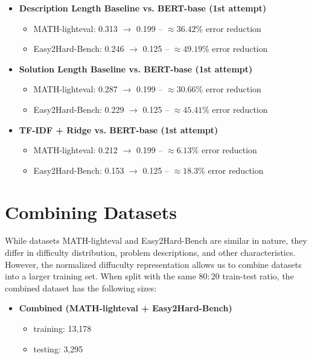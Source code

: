 \documentclass[runningheads]{llncs}
\begin{document}
\begin{itemize}
    \item \textbf{Description Length Baseline vs. BERT-base (1st attempt)}
    \begin{itemize}
        \item MATH-lighteval: 0.313 $\to$ 0.199 -- $\approx 36.42\%$ error reduction
        \item Easy2Hard-Bench: 0.246 $\to$ 0.125 -- $\approx 49.19\%$ error reduction
    \end{itemize}

\vspace{10pt}

    \item \textbf{Solution Length Baseline vs. BERT-base (1st attempt)}
    \begin{itemize}
        \item MATH-lighteval: 0.287 $\to$ 0.199 -- $\approx 30.66\%$ error reduction
        \item Easy2Hard-Bench: 0.229 $\to$ 0.125 -- $\approx 45.41\%$ error reduction
    \end{itemize}

\vspace{10pt}

    \item \textbf{TF-IDF + Ridge vs. BERT-base (1st attempt)}
    \begin{itemize}
        \item MATH-lighteval: 0.212 $\to$ 0.199 -- $\approx 6.13\%$ error reduction
        \item Easy2Hard-Bench: 0.153 $\to$ 0.125 -- $\approx 18.3\%$ error reduction
    \end{itemize}

\end{itemize}

\section{Combining Datasets}
\label{sec:combine}

While datasets MATH-lighteval and Easy2Hard-Bench are similar in nature, they differ in difficulty distribution, problem descriptions, and other characteristics. However, the normalized diffuculty representation allows us to combine datasets into a larger training set. When split with the same $80:20$ train-test ratio, the combined dataset has the following sizes:

\begin{itemize}
    \item \textbf{Combined (MATH-lighteval + Easy2Hard-Bench)}
    \begin{itemize}
        \item training: 13{,}178
        \item testing: 3{,}295
    \end{itemize}
\end{itemize}
\end{document}
